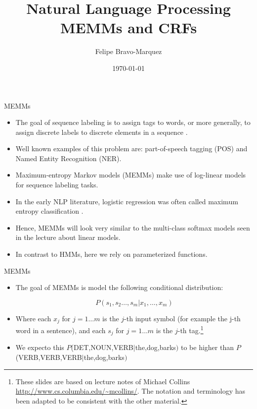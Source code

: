 \documentclass[handout]{beamer}
\title{Natural Language Processing \\ MEMMs and CRFs}
\author[Felipe Bravo Márquez]{\footnotesize
 \textcolor[rgb]{0.00,0.00,1.00}{Felipe Bravo-Marquez}}
\date{\today}
\begin{document}
\begin{frame}
\titlepage


\end{frame}


\begin{frame}{MEMMs}
\begin{scriptsize}
\begin{itemize}

\item The goal of sequence labeling is to assign tags to words, or more generally, to assign discrete labels to discrete elements in a sequence \cite{jacobbook}.

\item Well known examples of this problem are: part-of-speech tagging (POS) and Named Entity Recognition (NER).

\item Maximum-entropy Markov models (MEMMs) make use of log-linear models for sequence labeling tasks.
 
 \item In the early NLP literature, logistic regression was often called maximum entropy classification \cite{jacobbook}.
 
 \item Hence, MEMMs will look very similar to the multi-class softmax models seen in the lecture about linear models. 
 
  \item In contrast to HMMs, here we rely on parameterized functions.

\end{itemize}


\end{scriptsize}
\end{frame}



\begin{frame}{MEMMs}
\begin{scriptsize}
\begin{itemize}


 \item The goal of MEMMs is  model the following conditional distribution:
 
 \begin{displaymath}
  P(s_1,s_2 \dots, s_m | x_1, \dots, x_m)
 \end{displaymath}

 \item Where each $x_j$ for $j = 1 \dots m$ is the $j$-th input symbol (for example the j-th word in a sentence), and each $s_j$ for $j = 1 \dots m$ is the $j$-th tag.\footnote{These slides are based on lecture notes of Michael Collins \url{http://www.cs.columbia.edu/~mcollins/}. The notation and terminology has been adapted to be consistent with the other material.}

\item We expecto this $P$(DET,NOUN,VERB$|$the,dog,barks$)$ to be higher than $P$(VERB,VERB,VERB$|$the,dog,barks$)$
 
\end{itemize}


\end{scriptsize}
\end{frame}
\end{document}
